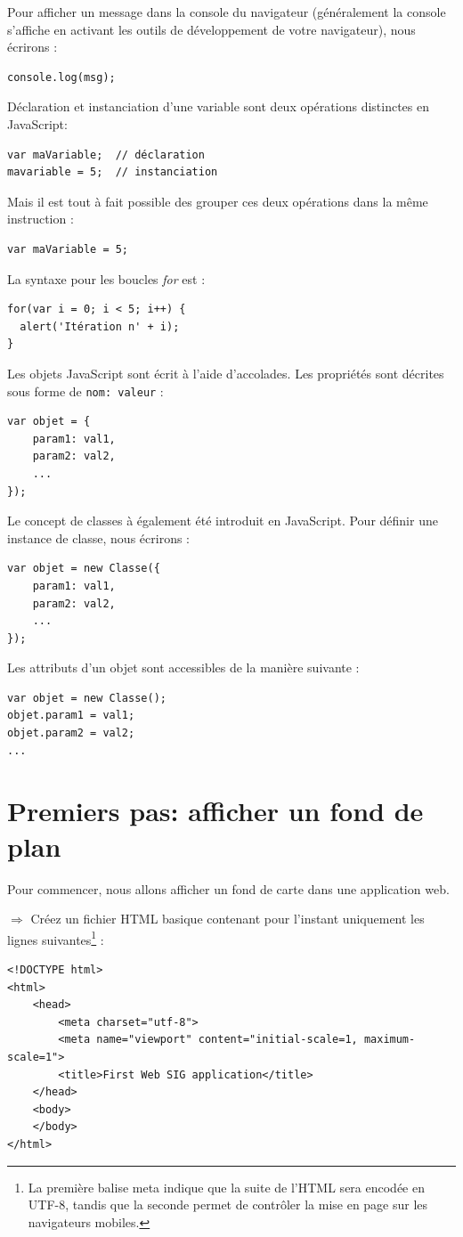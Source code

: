 \documentclass[11pt]{article}
\newcommand{\action}{$\Rightarrow$ }
\newcommand{\code}[1]{\lstinline{#1}}
\begin{document}
Pour afficher un message dans la console du navigateur (généralement la console s'affiche en activant les outils de développement de votre navigateur), nous écrirons :
\begin{lstlisting}
console.log(msg);
\end{lstlisting}

Déclaration et instanciation d'une variable sont deux opérations distinctes en JavaScript:
\begin{lstlisting}
var maVariable;  // déclaration
mavariable = 5;  // instanciation
\end{lstlisting}

Mais il est tout à fait possible des grouper ces deux opérations dans la même instruction :
\begin{lstlisting}
var maVariable = 5;
\end{lstlisting}

La syntaxe pour les boucles \textit{for} est :
\begin{lstlisting}
for(var i = 0; i < 5; i++) {
  alert('Itération n' + i);
}
\end{lstlisting}

Les objets JavaScript sont écrit à l'aide d'accolades.
Les propriétés sont décrites sous forme de \code{nom: valeur} :
\begin{lstlisting}
var objet = {
	param1: val1,
	param2: val2,
	...
});
\end{lstlisting}

Le concept de classes à également été introduit en JavaScript.
Pour définir une instance de classe, nous écrirons :
\begin{lstlisting}
var objet = new Classe({
	param1: val1,
	param2: val2,
	...
});
\end{lstlisting}

Les attributs d'un objet sont accessibles de la manière suivante :
\begin{lstlisting}
var objet = new Classe();
objet.param1 = val1;
objet.param2 = val2;
...
\end{lstlisting}

\newpage



\section{Premiers pas: afficher un fond de plan}
Pour commencer, nous allons afficher un fond de carte dans une application web.

\action Créez un fichier HTML basique contenant pour l'instant uniquement les lignes suivantes\footnote{La première balise meta indique que la suite de l'HTML sera encodée en UTF-8, tandis que la seconde permet de contrôler la mise en page sur les navigateurs mobiles.} :
\begin{lstlisting}
<!DOCTYPE html>
<html>
	<head>
		<meta charset="utf-8">
		<meta name="viewport" content="initial-scale=1, maximum-scale=1">
		<title>First Web SIG application</title>
	</head>
	<body>
	</body>
</html>
\end{lstlisting}
\end{document}
